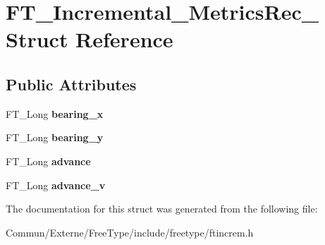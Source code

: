 \hypertarget{struct_f_t___incremental___metrics_rec__}{}\section{F\+T\+\_\+\+Incremental\+\_\+\+Metrics\+Rec\+\_\+ Struct Reference}
\label{struct_f_t___incremental___metrics_rec__}
\subsection*{Public Attributes}
\begin{DoxyCompactItemize}
\item 
F\+T\+\_\+\+Long {\bfseries bearing\+\_\+x}\hypertarget{struct_f_t___incremental___metrics_rec___af065d998d0a0f2a57513125038d802a6}{}\label{struct_f_t___incremental___metrics_rec___af065d998d0a0f2a57513125038d802a6}

\item 
F\+T\+\_\+\+Long {\bfseries bearing\+\_\+y}\hypertarget{struct_f_t___incremental___metrics_rec___af1443aa7c1ca54d3c2a29f1cf6d7848b}{}\label{struct_f_t___incremental___metrics_rec___af1443aa7c1ca54d3c2a29f1cf6d7848b}

\item 
F\+T\+\_\+\+Long {\bfseries advance}\hypertarget{struct_f_t___incremental___metrics_rec___a996c99aa0e6b36c2c7776fc1a2b6b614}{}\label{struct_f_t___incremental___metrics_rec___a996c99aa0e6b36c2c7776fc1a2b6b614}

\item 
F\+T\+\_\+\+Long {\bfseries advance\+\_\+v}\hypertarget{struct_f_t___incremental___metrics_rec___a0ee280662a03ea935dbfe377e56f4d6d}{}\label{struct_f_t___incremental___metrics_rec___a0ee280662a03ea935dbfe377e56f4d6d}

\end{DoxyCompactItemize}


The documentation for this struct was generated from the following file\+:\begin{DoxyCompactItemize}
\item 
Commun/\+Externe/\+Free\+Type/include/freetype/ftincrem.\+h\end{DoxyCompactItemize}
